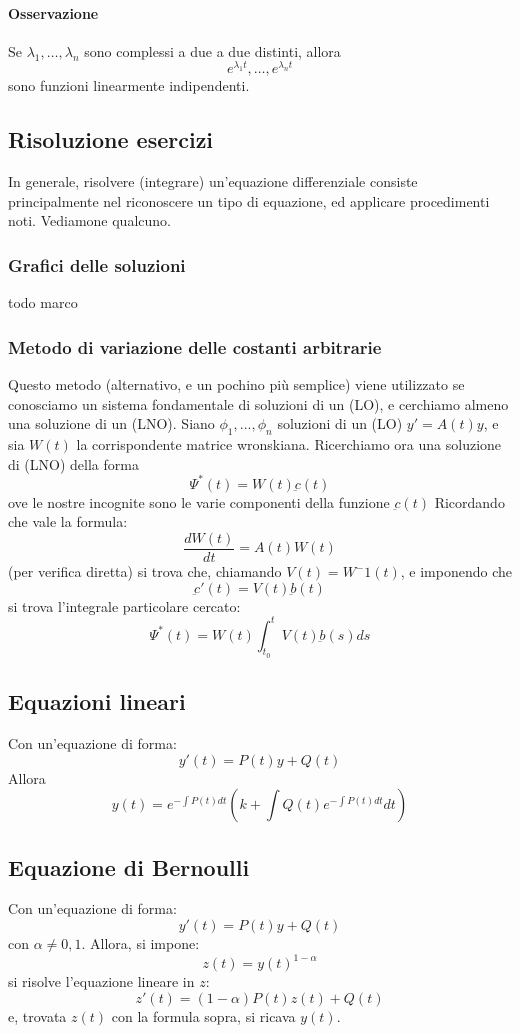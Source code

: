 \documentclass[a4paper,12pt]{article}
\begin{document}
\paragraph*{Osservazione}
Se  $\lambda_1,\dots,\lambda_n$ sono complessi a due a due distinti, allora 
$$ e^{\lambda_1 t}, \dots ,e^{\lambda_n t}$$ sono funzioni linearmente indipendenti. 



\subsection{Risoluzione esercizi}
In generale, risolvere (integrare) un'equazione differenziale consiste principalmente nel riconoscere un tipo di equazione, ed applicare procedimenti noti. Vediamone qualcuno.

\subsubsection{Grafici delle soluzioni}
todo marco
\subsubsection{Metodo di variazione delle costanti arbitrarie}
Questo metodo (alternativo, e un pochino più semplice) viene utilizzato se conosciamo un sistema fondamentale di soluzioni di un (LO), e cerchiamo almeno una soluzione di un (LNO).
Siano $\phi_1,...,\phi_n$ soluzioni di un (LO) $y'= A(t)y$, e sia $W(t)$ la corrispondente matrice wronskiana.
Ricerchiamo ora una soluzione di (LNO) della forma
$$\Psi^*(t)=W(t)\underbar{c}(t)$$
ove le nostre incognite sono le varie componenti della funzione $\underbar{c}(t)$
Ricordando che vale la formula:
$$\frac{dW(t)}{dt} = A(t)W(t)$$
(per verifica diretta) si trova che, chiamando $V(t) = W^-1(t)$, e imponendo che $$\underbar{c}'(t) = V(t)\underbar{b}(t)$$
si trova l'integrale particolare cercato:
$$\Psi^*(t)= W(t)\int_{t_0}^t V(t)\underbar{b}(s) ds$$

\subsection{Equazioni lineari}
Con un'equazione di forma:
$$y'(t) = P(t)y+Q(t)$$
Allora
$$y(t)=e^{- \displaystyle\int P(t)dt}\left(k + \int Q(t)e^{-\displaystyle\int P(t)dt}dt\right)$$
\subsection{Equazione di Bernoulli}
Con un'equazione di forma:
$$y'(t) = P(t)y+Q(t)$$
con $\alpha \neq 0, 1$. Allora, si impone:
$$ z(t)=y(t)^{1-\alpha} $$
si risolve l'equazione lineare in $z$: $$z'(t)=(1-\alpha)P(t)z(t)+Q(t)$$ e, trovata $z(t)$ con la formula sopra, si ricava $y(t)$.
\end{document}
